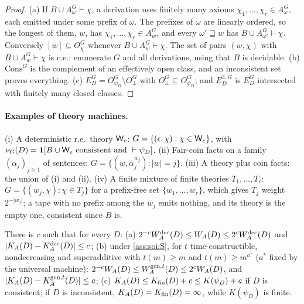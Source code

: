 \begin{proof}
(a) If $B\cup A^G_\omega\vdash\chi$, a derivation uses finitely many axioms $\chi_1,\dots,\chi_r\in A^G_\omega$, each emitted under some prefix of $\omega$. The prefixes of $\omega$ are linearly ordered, so the longest of them, $w$, has $\chi_1,\dots,\chi_r\in A^G_w$, and every $\omega'\sqsupseteq w$ has $B\cup A^G_{\omega'}\vdash\chi$. Conversely $[w]\subseteq O^G_\chi$ whenever $B\cup A^G_w\vdash\chi$. The set of pairs $(w,\chi)$ with $B\cup A^G_w\vdash\chi$ is c.e.: enumerate $G$ and all derivations, using that $B$ is decidable. (b) $\mathrm{Cons}^G$ is the complement of an effectively open class, and an inconsistent set proves everything. (c) $E^G_D=O^G_{\psi_D}\setminus O^G_\bot$ with $O^G_\bot\subseteq O^G_{\psi_D}$; and $E^{3,G}_D$ is $E^G_D$ intersected with finitely many closed classes.
\end{proof}

\paragraph{Examples of theory machines.}\label{par:setting:examples} (i) A deterministic r.e.\ theory $\mathsf{W}_{e}$: $G=\{(\epsilon,\chi):\chi\in\mathsf{W}_{e}\}$, with $\nu_G(D)=\mathbf{1}[B\cup\mathsf{W}_{e}\text{ consistent and }\vdash\psi_D]$. (ii) Fair-coin facts on a family $(\alpha_j)_{j\ge1}$ of sentences: $G=\{(w,\alpha_j^{w_j}):\lvert w\rvert=j\}$. (iii) A theory plus coin facts: the union of (i) and (ii). (iv) A finite mixture of finite theories $T_1,\dots,T_r$: $G=\{(w_j,\chi):\chi\in T_j\}$ for a prefix-free set $\{w_1,\dots,w_r\}$, which gives $T_j$ weight $2^{-\lvert w_j\rvert}$; a tape with no prefix among the $w_j$ emits nothing, and its theory is the empty one, consistent since $B$ is.

\begin{remark}\label{rem:setting:versions}
There is $c$ such that for every $D$:
(a) $2^{-c}W_{A}^{\mathrm{dec}}(D)\le W_{A}(D)\le2^cW_{A}^{\mathrm{dec}}(D)$ and $\lvert K_{A}(D)-K_{A}^{\mathrm{dec}}(D)\rvert\le c$;
(b) under \cref{ass:soi:S}, for $t$ time-constructible, nondecreasing and superadditive with $t(m)\ge m$ and $t(m)\ge m^{a^*}$ ($a^*$ fixed by the universal machine): $2^{-c}W_{A}(D)\le W_{A}^{\mathrm{gen},t}(D)\le2^cW_{A}(D)$, and $\lvert K_{A}(D)-K_A^{\mathrm{gen},t}(D)\rvert\le c$;
(c) $K_{A}(D)\le K_{\mathrm{fin}}(D)+c\le K(\psi_D)+c$ if $D$ is consistent; if $D$ is inconsistent, $K_{A}(D)=K_{\mathrm{fin}}(D)=\infty$, while $K(\psi_D)$ is finite.
\end{remark}

